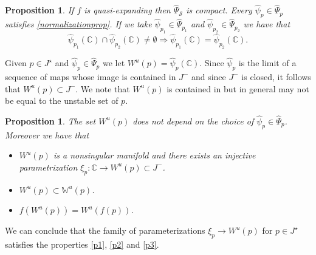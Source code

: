 \documentclass[10pt,a4paper]{article}
\newtheorem{proposition}[theorem]{Proposition}
\begin{document}
\begin{proposition}
\label{normpropnormfam}
If $f$ is quasi-expanding then $\widehat \Psi_\mathcal S$ is compact. Every $\widehat\psi_p\in\widehat\Psi_p$ satisfies \eqref{normalizationprop}. If we take $\widehat\psi_{p_1}\in\widehat\Psi_{p_1}$ and $\widehat\psi_{p_2}\in\widehat\Psi_{p_2}$ we have that
\[
\widehat\psi_{p_1}(\mathbb C)\cap\widehat\psi_{p_2}(\mathbb C)\neq \emptyset\Rightarrow\widehat\psi_{p_1}(\mathbb C)=\widehat\psi_{p_2}(\mathbb C).
\]
\end{proposition}

Given $p\in J^\star$ and $\widehat\psi_p\in\widehat{\Psi}_p$ we let $W^u(p)=\widehat\psi_p(\mathbb C)$. Since $\widehat\psi_p$ is the limit of a sequence of maps whose image is contained in $J^-$ and since $J^-$ is closed, it follows that $W^u(p)\subset J^-$. We note that $W^u(p)$ is contained in but in general may not be equal to the unstable set of $p$.

\begin{proposition}
\label{injectiveparameter}
The set $W^u(p)$ does not depend on the choice of $\widehat\psi_p\in\widehat{\Psi}_p$. Moreover we have that
\begin{itemize}
\item[(i)] $W^u(p)$ is a nonsingular manifold and there exists an injective parametrization $\xi_p:\mathbb C\rightarrow W^u(p)\subset J^-$.
\item[(ii)] $W^u(p)\subset \mathbb W^u(p)$.
\item[(iii)] $f(W^u(p))=W^u(f(p))$.
\end{itemize}
\end{proposition}

We can conclude that the family of parameterizations $\xi_p\rightarrow W^u(p)$ for $p\in J^\star$ satisfies the properties \eqref{p1}, \eqref{p2} and \eqref{p3}.
\end{document}
